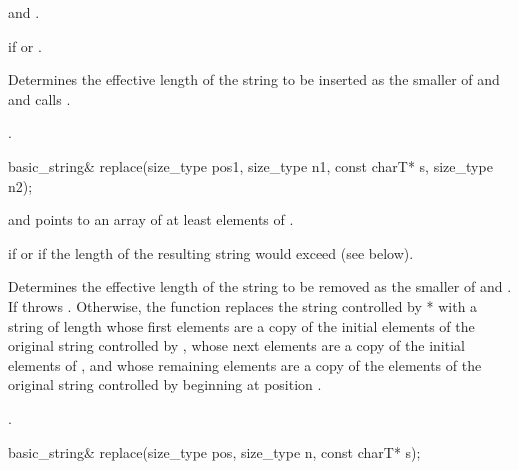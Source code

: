 \begin{itemdescr}
\pnum
\requires
{} and .

\pnum
\throws
{}
if
or
.

\pnum
\effects
Determines the effective length  of the string to be inserted
as the smaller of  and  and calls
.

\pnum
\returns
{}.
\end{itemdescr}

%
%
\begin{itemdecl}
basic_string&
  replace(size_type pos1, size_type n1, const charT* s, size_type n2);
\end{itemdecl}

\begin{itemdescr}
\pnum
\requires {} and  points to an array of at
least  elements of .

\pnum
\throws {} if  or 
if the length of the resulting string would exceed  (see below).

\pnum
\effects Determines the effective length  of the string to be
removed as the smaller of  and . If
 throws . Otherwise,
the function replaces the string controlled by * with a string of
length  whose first  elements are a copy
of the initial elements of the original string controlled by ,
whose next  elements are a copy of the initial  elements
of , and whose remaining elements are a copy of the elements of the
original string controlled by  beginning at position
.

\pnum
\returns
{}.
\end{itemdescr}

%
%
\begin{itemdecl}
basic_string&
  replace(size_type pos, size_type n, const charT* s);
\end{itemdecl}

